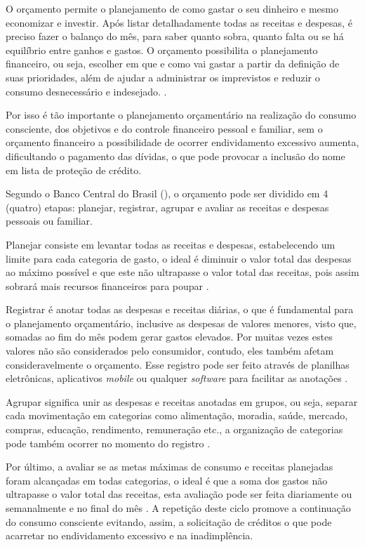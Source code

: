 \begin{citacao}
O orçamento permite o planejamento de como gastar o seu dinheiro e mesmo economizar e investir. Após listar detalhadamente todas as receitas e despesas, é preciso fazer o balanço do mês, para saber quanto sobra, quanto falta ou se há equilíbrio entre ganhos e gastos. O orçamento possibilita o planejamento financeiro, ou seja, escolher em que e como vai gastar a partir da definição de suas prioridades, além de ajudar a administrar os imprevistos e reduzir o consumo desnecessário e indesejado. \cite{buaes2015}.
\end{citacao} 

Por isso é tão importante o planejamento orçamentário na realização do consumo consciente, dos objetivos e do controle financeiro pessoal e familiar, sem o orçamento financeiro a possibilidade de ocorrer endividamento excessivo aumenta, dificultando o pagamento das dívidas, o que pode provocar a inclusão do nome em lista de proteção de crédito.

Segundo o Banco Central do Brasil (\citeyear{bacen2013}), o orçamento pode ser dividido em 4 (quatro) etapas: planejar, registrar, agrupar e avaliar as receitas e despesas pessoais ou familiar.

Planejar consiste em levantar todas as receitas e despesas, estabelecendo um limite para cada categoria de gasto, o ideal é diminuir o valor total das despesas ao máximo possível e que este não ultrapasse o valor total das receitas, pois assim sobrará mais recursos financeiros para poupar \cite{bacen2013}.

Registrar é anotar todas as despesas e receitas diárias, o que é fundamental para o planejamento orçamentário, inclusive as despesas de valores menores, visto que, somadas ao fim do mês podem gerar gastos elevados. Por muitas vezes estes valores não são considerados pelo consumidor, contudo, eles também afetam consideravelmente o orçamento. Esse registro pode ser feito através de planilhas eletrônicas, aplicativos \textit{mobile} ou qualquer \textit{software} para facilitar as anotações \cite{bacen2013}.

Agrupar significa unir as despesas e receitas anotadas em grupos, ou seja, separar cada movimentação em categorias como alimentação, moradia, saúde, mercado, compras, educação, rendimento, remuneração etc., a organização de categorias pode também ocorrer no momento do registro \cite{bacen2013}.

Por último, a avaliar se as metas máximas de consumo e receitas planejadas foram alcançadas em todas categorias, o ideal é que a soma dos gastos não ultrapasse o valor total das receitas, esta avaliação pode ser feita diariamente ou semanalmente e no final do mês \cite{bacen2013}. A repetição deste ciclo promove a continuação do consumo consciente evitando, assim, a solicitação de créditos o que pode acarretar no endividamento excessivo e na inadimplência.

